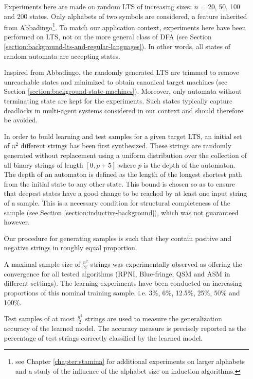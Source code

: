 Experiments here are made on random LTS of increasing sizes: $n$ = 20, 50, 100 and 200 states. Only alphabets of two symbols are considered, a feature inherited from Abbadingo\footnote{see Chapter \ref{chapter:stamina} for additional experiments on larger alphabets and a study of the influence of the alphabet size on induction algorithms.}. To match our application context, experiments here have been performed on LTS, not on the more general class of DFA (see Section \ref{section:background-lts-and-regular-languages}). In other words, all states of random automata are accepting states.

Inspired from Abbadingo, the randomly generated LTS are trimmed to remove unreachable states and minimized to obtain canonical target machines (see Section \ref{section:background-state-machines}). Moreover, only automata without terminating state are kept for the experiments. Such states typically capture deadlocks in multi-agent systems considered in our context and should therefore be avoided.

In order to build learning and test samples for a given target LTS, an initial set of $n^2$ different strings has been first synthesized. These strings are randomly generated without replacement using a uniform distribution over the collection of all binary strings of length $[0, p+5]$ where $p$ is the depth of the automaton. The depth of an automaton is defined as the length of the longest shortest path from the initial state to any other state. This bound is chosen so as to ensure that deepest states have a good change to be reached by at least one input string of a sample. This is a necessary condition for structural completeness of the sample (see Section \ref{section:inductive-background}), which was not guaranteed however.

Our procedure for generating samples is such that they contain positive and negative strings in roughly equal proportion.
 
A maximal sample size of $\frac{n^2}{2}$ strings was experimentally observed as offering the convergence for all tested algorithms (RPNI, Blue-fringe, QSM and ASM in different settings). The learning experiments have been conducted on increasing proportions of this nominal training sample, i.e. 3\%, 6\%, 12.5\%, 25\%, 50\% and 100\%.

Test samples of at most $\frac{n^2}{2}$ strings are used to measure the generalization accuracy of the learned model. The accuracy measure is precisely reported as the percentage of test strings correctly classified by the learned model.

